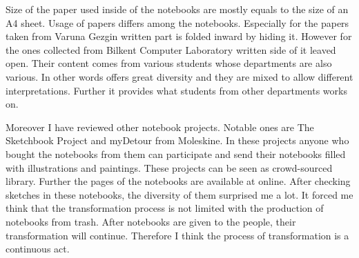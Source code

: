 


Size of the paper used inside of the notebooks are mostly equals to the size of an A4 sheet. Usage of papers differs among the notebooks. Especially for the papers taken from Varuna Gezgin written part is folded inward by hiding it. However for the ones collected from Bilkent Computer Laboratory written side of it leaved open. Their content comes from various students whose departments are also various. In other words offers great diversity and they are mixed to allow different interpretations. Further it provides what students from other departments works on. %





Moreover I have reviewed other notebook projects. Notable ones are The Sketchbook Project and myDetour from Moleskine. In these projects anyone who bought the notebooks from them can participate and send their notebooks filled with illustrations and paintings. These projects can be seen as crowd-sourced library. Further the pages of the notebooks are available at online. After checking sketches in these notebooks, the diversity of them surprised me a lot. It forced me think that the transformation process is not limited with the production of notebooks from trash. After notebooks are given to the people, their transformation will continue. Therefore I think the process of transformation is a continuous act.


